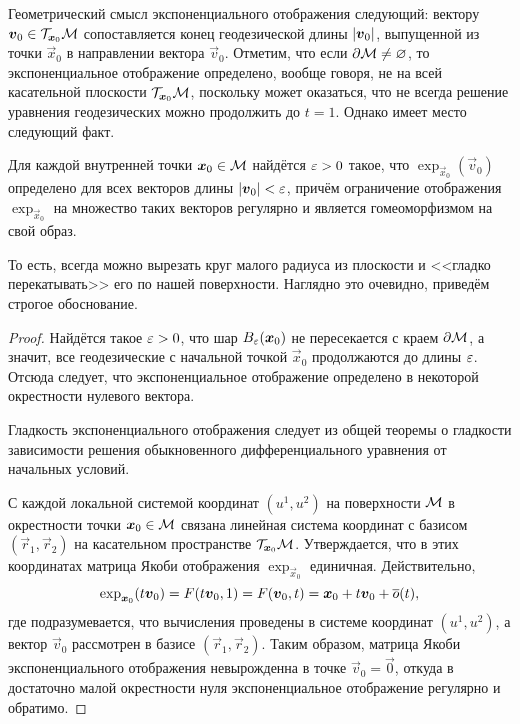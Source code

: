 Геометрический смысл экспоненциального отображения следующий: вектору $\boldsymbol{v}_0 \in \mathcal{T}_{\boldsymbol{x}_0}\mathcal{M}$ сопоставляется конец геодезической длины $\left\lvert\boldsymbol{v}_0\right\rvert$, выпущенной из точки $\vec{x}_0$ в направлении вектора $\vec{v}_0$. Отметим, что если $\partial\mathcal{M} \ne \varnothing$, то экспоненциальное отображение определено, вообще говоря, не на всей касательной плоскости $\mathcal{T}_{\boldsymbol{x}_0}\mathcal{M}$, поскольку может оказаться, что не всегда решение уравнения геодезических можно продолжить до $t = 1$. Однако имеет место следующий факт.

\begin{theorem}
	Для каждой внутренней точки $\boldsymbol{x}_0 \in \mathcal{M}$ найдётся $\varepsilon > 0$ такое, что $\exp_{\vec{x}_0}(\vec{v}_0)$ определено для всех векторов длины $\left\lvert\boldsymbol{v}_0\right\rvert < \varepsilon$, причём ограничение отображения $\exp_{\vec{x}_0}$ на множество таких векторов регулярно и является гомеоморфизмом на свой образ.
\end{theorem}

То есть, всегда можно вырезать круг малого радиуса из плоскости и <<гладко перекатывать>> его по нашей поверхности. Наглядно это очевидно, приведём строгое обоснование.

\begin{proof}
	Найдётся такое $\varepsilon > 0$, что шар $B_{\varepsilon}(\boldsymbol{x}_0)$ не пересекается с краем $\partial\mathcal{M}$, а значит, все геодезические с начальной точкой $\vec{x}_0$ продолжаются до длины $\varepsilon$. Отсюда следует, что экспоненциальное отображение определено в некоторой окрестности нулевого вектора.

	Гладкость экспоненциального отображения следует из общей теоремы о гладкости зависимости решения обыкновенного дифференциального уравнения от начальных условий.

	С каждой локальной системой координат $(u^1, u^2)$ на поверхности $\mathcal{M}$ в окрестности точки $\boldsymbol{x}_0 \in \mathcal{M}$ связана линейная система координат с базисом $(\vec{r}_1, \vec{r}_2)$ на касательном пространстве $\mathcal{T}_{\boldsymbol{x}_0}\mathcal{M}$. Утверждается, что в этих координатах матрица Якоби отображения $\exp_{\vec{x}_0}$ единичная. Действительно,
	\[
		\exp_{\boldsymbol{x}_0}(t\boldsymbol{v}_0) = F(t\boldsymbol{v}_0, 1) = F(\boldsymbol{v}_0, t) = \boldsymbol{x}_0 + t\boldsymbol{v}_0 + \overline{o}(t),
	\]
	где подразумевается, что вычисления проведены в системе координат $(u^1, u^2)$, а вектор $\vec{v}_0$ рассмотрен в базисе $(\vec{r}_1, \vec{r}_2)$. Таким образом, матрица Якоби экспоненциального отображения невырожденна в точке $\vec{v}_0 = \vec{0}$, откуда в достаточно малой окрестности нуля экспоненциальное отображение регулярно и обратимо.
\end{proof}

